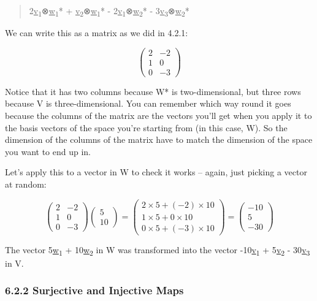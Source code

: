 \documentclass[oneside,english]{amsbook}
\numberwithin{section}{chapter}
\theoremstyle{plain}
\theoremstyle{definition}
\begin{document}
\begin{quote}
	2\ul{v}\textsubscript{1}⊗\ul{w}\textsubscript{1}* +
	\ul{v}\textsubscript{2}⊗\ul{w}\textsubscript{1}* -
	2\ul{v}\textsubscript{1}⊗\ul{w}\textsubscript{2}* -
	3\ul{v}\textsubscript{3}⊗\ul{w}\textsubscript{2}*
\end{quote}

We can write this as a matrix as we did in 4.2.1:

\[\begin{pmatrix}
	2 & - 2 \\
	1 & 0 \\
	0 & - 3
\end{pmatrix}\]

Notice that it has two columns because W* is two-dimensional, but three
rows because V is three-dimensional. You can remember which way round it
goes because the columns of the matrix are the vectors you'll get when
you apply it to the basis vectors of the space you're starting from (in
this case, W). So the dimension of the columns of the matrix have to
match the dimension of the space you want to end up in.

Let's apply this to a vector in W to check it works -- again, just
picking a vector at random:

\[\begin{pmatrix}
	2 & - 2 \\
	1 & 0 \\
	0 & - 3
\end{pmatrix}\begin{pmatrix}
	5 \\
	10
\end{pmatrix} = \begin{pmatrix}
	2 \times 5 + ( - 2) \times 10 \\
	1 \times 5 + 0 \times 10 \\
	0 \times 5 + ( - 3) \times 10
\end{pmatrix} = \begin{pmatrix}
	- 10 \\
	5 \\
	- 30
\end{pmatrix}\]

The vector 5\ul{w}\textsubscript{1} + 10\ul{w}\textsubscript{2} in W was
transformed into the vector -10\ul{v}\textsubscript{1} +
5\ul{v}\textsubscript{2} - 30\ul{v}\textsubscript{3} in V.

\subsubsection{6.2.2 Surjective and Injective
	Maps}\label{surjective-and-injective-maps}
\end{document}
